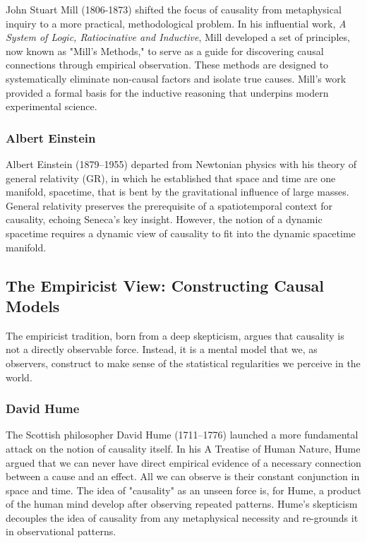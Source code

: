 John Stuart Mill (1806-1873) shifted the focus of causality from metaphysical inquiry to a more practical, methodological problem. In his influential work, \textit{A System of Logic, Ratiocinative and Inductive}\cite{mill2023system}, Mill developed a set of principles, now known as "Mill's Methods," to serve as a guide for discovering causal connections through empirical observation. These methods are designed to systematically eliminate non-causal factors and isolate true causes. Mill's work provided a formal basis for the inductive reasoning that underpins modern experimental science.


\subsubsection{Albert Einstein}
\label{sec:history_einstein}

Albert Einstein (1879--1955) departed from Newtonian physics with his theory of general relativity\cite{EinsteinPapers1915} (GR), in which he established that space and time are one manifold, spacetime, that is bent by the gravitational influence of large masses. General relativity preserves the prerequisite of a spatiotemporal context for causality, echoing Seneca's key insight. However, the notion of a dynamic spacetime requires a dynamic view of causality to fit into the dynamic spacetime manifold.

\subsection{The Empiricist View: Constructing Causal Models}
\label{ssec:philosophy_empiricist}

The empiricist tradition, born from a deep skepticism, argues that causality is not a directly observable force. Instead, it is a mental model that we, as observers, construct to make sense of the statistical regularities we perceive in the world.


\subsubsection{David Hume}
\label{sec:history_hume}

The Scottish philosopher David Hume (1711–1776) launched a more fundamental attack on the notion of causality itself. In his A Treatise of Human Nature\cite{hume2000treatise}, Hume argued that we can never have direct empirical evidence of a necessary connection between a cause and an effect. All we can observe is their constant conjunction in space and time. The idea of "causality" as an unseen force is, for Hume, a product of the human mind develop after observing repeated patterns. Hume's skepticism decouples the idea of causality from any metaphysical necessity and re-grounds it in observational patterns\cite{hume2000treatise}.


